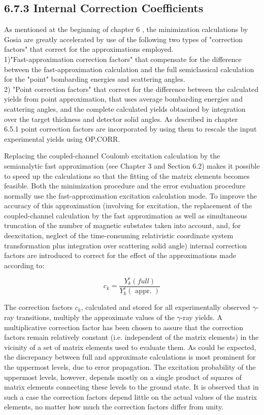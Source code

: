 \documentclass[10pt]{article}
\begin{document}
\subsection*{6.7.3 Internal Correction Coefficients}
As mentioned at the beginning of chapter 6 , the minimization calculations by Gosia are greatly accelerated by use of the following two types of "correction factors" that correct for the approximations employed.\\
1)"Fast-approximation correction factors" that compensate for the difference between the fast-approximation calculation and the full semiclassical calculation for the "point" bombarding energies and scattering angles.\\
2) "Point correction factors" that correct for the difference between the calculated yields from point approximation, that uses average bombarding energies and scattering angles, and the complete calculated yields obtasined by integration over the target thickness and detector solid angles. As described in chapter\\
6.5.1 point correction factors are incorporated by using them to rescale the input experimental yields using OP,CORR.

Replacing the coupled-channel Coulomb excitation calculation by the semianalytic fast approximation (see Chapter 3 and Section 6.2) makes it possible to speed up the calculations so that the fitting of the matrix elements becomes feasible. Both the minimization procedure and the error evaluation procedure normally use the fast-approximation excitation calculation mode. To improve the accuracy of this approximation (involving for excitation, the replacement of the coupled-channel calculation by the fast approximation as well as simultaneous truncation of the number of magnetic substates taken into account, and, for deexcitation, neglect of the time-consuming relativistic coordinate system transformation plus integration over scattering solid angle) internal correction factors are introduced to correct for the effect of the approximations made according to:


\begin{equation*}
c_{k}=\frac{Y_{k}^{c}(f u l l)}{Y_{k}^{c}(\text { appr. })} \tag{6.84}
\end{equation*}


The correction factors $c_{k}$, calculated and stored for all experimentally observed $\gamma$-ray transitions, multiply the approximate values of the $\gamma$-ray yields. A multiplicative correction factor has been chosen to assure that the correction factors remain relatively constant (i.e. independent of the matrix elements) in the vicinity of a set of matrix elements used to evaluate them. As could be expected, the discrepancy between full and approximate calculations is most prominent for the uppermost levels, due to error propagation. The excitation probability of the uppermost levels, however, depends mostly on a single product of squares of matrix elements connecting these levels to the ground state. It is observed that in such a case the correction factors depend little on the actual values of the matrix elements, no matter how much the correction factors differ from unity.
\end{document}
